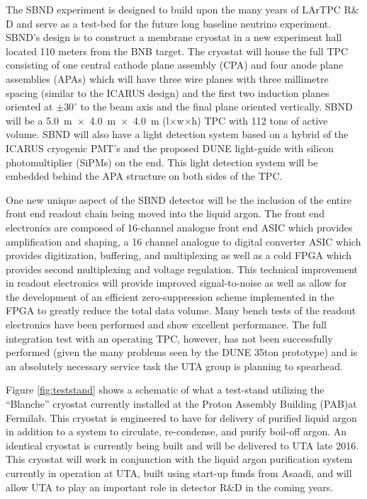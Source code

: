 \label{sec:IF_SBND}
The SBND experiment is designed to build upon the many years of LArTPC R$\&$D and serve as a test-bed for the future long baseline neutrino experiment. SBND's design is to construct a membrane cryostat in a new experiment hall located 110 meters from the BNB target. The cryostat will house the full TPC consisting of one central cathode plane assembly (CPA) and four anode plane assemblies (APAs) which will have three wire planes with three millimetre spacing (similar to the ICARUS design) and the first two induction planes oriented at $\pm 30^{\circ}$ to the beam axis and the final plane oriented vertically. SBND will be a 5.0~m~$\times$~4.0~m~$\times$~4.0~m (l$\times$w$\times$h) TPC with 112 tons of active volume. SBND will also have a light detection system based on a hybrid of the ICARUS cryogenic PMT's and the proposed DUNE light-guide with silicon photomultiplier (SiPMs) on the end. This light detection system will be embedded behind the APA structure on both sides of the TPC. 


One new unique aspect of the SBND detector will be the inclusion of the entire front end readout chain being moved into the liquid argon. The front end electronics are composed of 16-channel analogue front end ASIC which provides amplification and shaping, a 16 channel analogue to digital converter ASIC which provides digitization, buffering, and multiplexing as well as a cold FPGA which provides second multiplexing and voltage regulation. This technical improvement in readout electronics will provide improved signal-to-noise as well as allow for the development of an efficient zero-suppression scheme implemented in the FPGA to greatly reduce the total data volume. Many bench tests of the readout electronics have been performed and show excellent performance. The full integration test with an operating TPC, however, has not been successfully performed (given the many problems seen by the DUNE 35ton prototype) and is an absolutely necessary service task the UTA group is planning to spearhead. 

\label{sec:SBNDTeststand}
Figure \ref{fig:teststand} shows a schematic of what a test-stand utilizing the ``Blanche'' cryostat currently installed at the Proton Assembly Building (PAB)at Fermilab. This cryostat is engineered to have for delivery of purified liquid argon in addition to a system to circulate, re-condense, and purify boil-off argon. An identical cryostat is currently being built and will be delivered to UTA late 2016. This cryostat will work in conjunction with the liquid argon purification system currently in operation at UTA, built using start-up funds from Asaadi, and will allow UTA to play an important role in detector R$\&$D in the coming years. 

